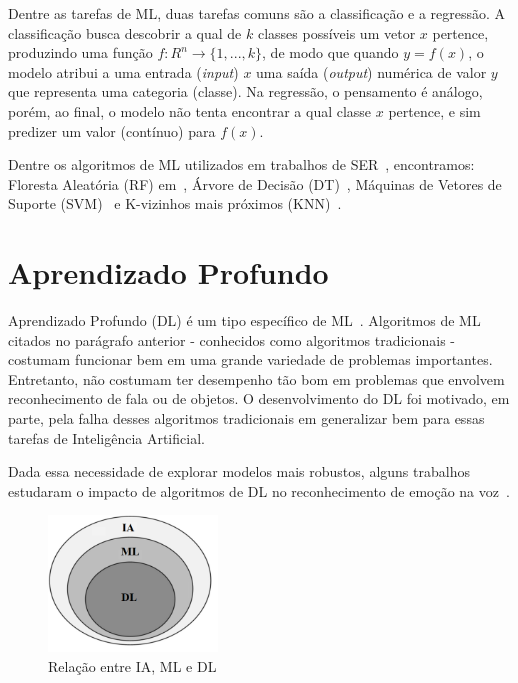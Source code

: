 Dentre as tarefas de \acrshort{ML}, duas tarefas comuns são a classificação e a regressão. A classificação busca descobrir a qual de $k$ classes possíveis um vetor $x$ pertence, produzindo uma função $f: R^n \rightarrow \{1, ..., k\}$, de modo que quando $y = f(x)$, o modelo atribui a uma entrada (\textit{input}) $x$ uma saída (\textit{output}) numérica de valor $y$ que representa uma categoria (classe). Na regressão, o pensamento é análogo, porém, ao final, o modelo não tenta encontrar a qual classe $x$ pertence, e sim predizer um valor (contínuo) para $f(x)$.

Dentre os algoritmos de \acrshort{ML} utilizados em trabalhos de \acrshort{SER}~\cite{20.7}, encontramos: Floresta Aleatória (\acrshort{RF}) em~\cite{20.10}, Árvore de Decisão (\acrshort{DT})~\cite{20.11}, Máquinas de Vetores de Suporte (\acrshort{SVM})~\cite{20.13} e K-vizinhos mais próximos (\acrshort{KNN})~\cite{20.15}.

\section{Aprendizado Profundo}\label{sec:dl}

Aprendizado Profundo (\acrshort{DL}) é um tipo específico de \acrshort{ML}~\cite{53}. Algoritmos de \acrshort{ML} citados no parágrafo anterior - conhecidos como algoritmos tradicionais - costumam funcionar bem em uma grande variedade de problemas importantes. Entretanto, não costumam ter desempenho tão bom em problemas que envolvem reconhecimento de fala ou de objetos. O desenvolvimento do \acrshort{DL} foi motivado, em parte, pela falha desses algoritmos tradicionais em generalizar bem para essas tarefas de Inteligência Artificial.

Dada essa necessidade de explorar modelos mais robustos, alguns trabalhos estudaram o impacto de algoritmos de \acrshort{DL} no reconhecimento de emoção na voz~\cite{12.12, 12.16}.

\begin{figure}[!h]
\centering
\includegraphics[width=0.4\textwidth]{img/ia-ml-dl-3.png}
\caption{\label{fig:ia-ml-dl}Relação entre \acrshort{IA}, \acrshort{ML} e \acrshort{DL}~\cite{img_iavsmlvsdl}}
\author{Fonte: Retirada de~\cite{58}}
\end{figure}

